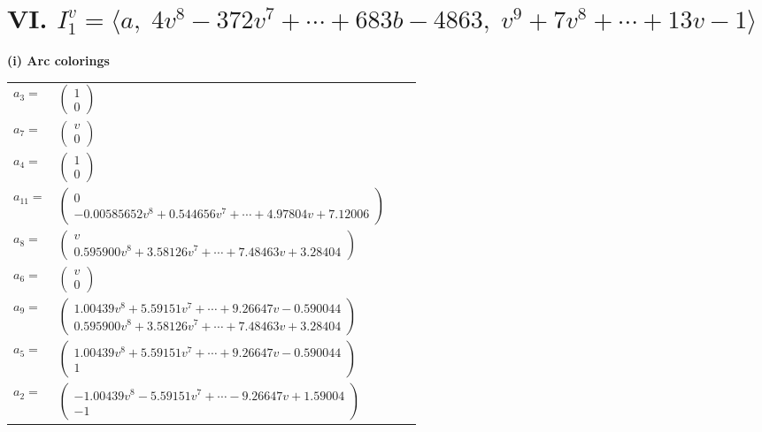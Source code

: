 \documentclass[1p]{elsarticle_modified}
\theoremstyle{definition}
\begin{document}
\centering \section*{VI. $I^v_{1}= \langle a,\;4 v^8-372 v^7+\cdots+683 b-4863,\;v^9+7 v^8+\cdots+13 v-1 \rangle$}
\flushleft \textbf{(i) Arc colorings}\\
\begin{tabular}{m{7pt} m{180pt} m{7pt} m{180pt} }
\flushright $a_{3}=$&$\begin{pmatrix}1\\0\end{pmatrix}$ \\
\flushright $a_{7}=$&$\begin{pmatrix}v\\0\end{pmatrix}$ \\
\flushright $a_{4}=$&$\begin{pmatrix}1\\0\end{pmatrix}$ \\
\flushright $a_{11}=$&$\begin{pmatrix}0\\-0.00585652 v^{8}+0.544656 v^{7}+\cdots+4.97804 v+7.12006\end{pmatrix}$ \\
\flushright $a_{8}=$&$\begin{pmatrix}v\\0.595900 v^{8}+3.58126 v^{7}+\cdots+7.48463 v+3.28404\end{pmatrix}$ \\
\flushright $a_{6}=$&$\begin{pmatrix}v\\0\end{pmatrix}$ \\
\flushright $a_{9}=$&$\begin{pmatrix}1.00439 v^{8}+5.59151 v^{7}+\cdots+9.26647 v-0.590044\\0.595900 v^{8}+3.58126 v^{7}+\cdots+7.48463 v+3.28404\end{pmatrix}$ \\
\flushright $a_{5}=$&$\begin{pmatrix}1.00439 v^{8}+5.59151 v^{7}+\cdots+9.26647 v-0.590044\\1\end{pmatrix}$ \\
\flushright $a_{2}=$&$\begin{pmatrix}-1.00439 v^{8}-5.59151 v^{7}+\cdots-9.26647 v+1.59004\\-1\end{pmatrix}$ \\

\end{tabular}
\end{document}
